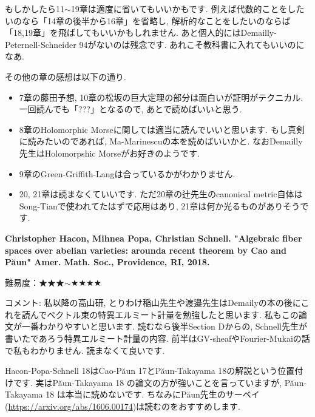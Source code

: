 もしかしたら11$\sim$19章は適度に省いてもいいかもです. 例えば代数的ことをしたいのなら「14章の後半から16章」を省略し, 解析的なことをしたいのならば「18,19章」を飛ばしてもいいかもしれません. 
あと個人的にはDemailly-Peternell-Schneider 94がないのは残念です. あれこそ教科書に入れてもいいのになあ. 

その他の章の感想は以下の通り.
\vspace{-8pt}
\begin{itemize}[left=0pt]
  \setlength{\parskip}{0cm} %
  \setlength{\itemsep}{0cm} %
\item 7章の藤田予想, 10章の松坂の巨大定理の部分は面白いが証明がテクニカル. 一回読んでも「???」となるので, あとで読めばいいと思う. 
\item 8章のHolomorphic Morseに関しては適当に読んでいいと思います. 
もし真剣に読みたいのであれば, Ma-Marinescuの本を読めばいいかと. なおDemailly先生はHolomorpshic Morseがお好きのようです. 
\item 9章のGreen-Griffith-Langは合っているかがわかりません. 
\item 20, 21章は読まなくていいです. ただ20章の辻先生のcanonical metric自体はSong-Tianで使われてたはずで応用はあり, 21章は何か光るものがありそうです. 
\end{itemize}
\vspace{8pt}

\textbf{Christopher Hacon, Mihnea Popa, Christian Schnell. "Algebraic fiber spaces over abelian varieties: arounda recent theorem by Cao and P\u{a}un"  Amer. Math. Soc., Providence, RI, 2018.}  \vspace{-6pt} 

難易度：★★★$\sim$★★★★ \vspace{-6pt} 

コメント: 私以降の高山研, とりわけ稲山先生や渡邉先生はDemailyの本の後にこれを読んでベクトル束の特異エルミート計量を勉強したと思います. 私もこの論文が一番わかりやすいと思います. 
読むなら後半Section Dからの, Schnell先生が書いたであろう特異エルミート計量の内容. 
前半はGV-sheafやFourier-Mukaiの話で私もわかりません. 読まなくて良いです.

Hacon-Popa-Schnell 18はCao-P\u{a}un 17とP\u{a}un-Takayama 18の解説という位置付けです. 
実はP\u{a}un-Takayama 18 の論文の方が強いことを言っていますが, P\u{a}un-Takayama 18 は本当に読めないです.
ちなみにP\u{a}un先生のサーベイ(\url{https://arxiv.org/abs/1606.00174})は読むのをおすすめします. 
\vspace{8pt}

